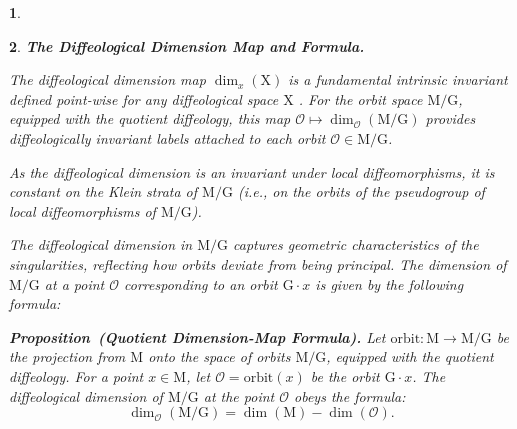 \documentclass[10pt,reqno,letterpaper,twoside]{amsart}
\theoremstyle{article}
\newtheorem{article}{}
\def\artlabel[#1]{\textbf{#1.}}
\newenvironment{proposition}[1]%
{\noindent\textbf{Proposition#1.} \it}%
{}
\newcommand{\cO}{{\mathcal O}}
\def \G{\mathrm G}
\def \M{\mathrm M}
\def \X{\mathrm X}
\newcommand{\orbit}{{\mathrm{orbit}}}
\begin{document}
\begin{article}
  \end{article}
  
  
  \begin{article}
    \artlabel[The Diffeological Dimension Map and Formula]
    \label{The_Dimension_Map_on_the_Quotient_Space}
    
    The diffeological dimension map $\dim_x(\X)$ is a fundamental intrinsic invariant defined point-wise for any diffeological space $\X$ \cite{PIZ07, PIZ13}.
    For the orbit space $\M/\G$,
    equipped with the quotient diffeology,
    this map $\cO \mapsto \dim_{\cO}(\M/\G)$ provides diffeologically invariant labels attached to each orbit $\cO \in \M/\G$.
    
    As the diffeological dimension is an invariant under local diffeomorphisms, it is constant on the Klein strata of $\M/\G$
    (i.e., on the orbits of the pseudogroup of local diffeomorphisms of $\M/\G$).
    
    The diffeological dimension in $\M/\G$ captures geometric characteristics of the singularities,
    reflecting how orbits deviate from being principal.
    The dimension of $\M/\G$ at a point $\cO$ corresponding to an orbit $\G \cdot x$ is given by the following formula:
    
    \begin{proposition}{~(Quotient Dimension-Map Formula)}
      \label{prop:dim_formula_orbit_space}
      Let $\orbit: \M \to \M/\G$ be the projection from $\M$ onto the space of orbits $\M/\G$,
      equipped with the quotient diffeology.
      For a point $x \in \M$, let $\cO = \orbit(x)$ be the orbit $\G \cdot x$.
      The diffeological dimension of $\M/\G$ at the point $\cO$ obeys the formula:
      \begin{equation}\tag{$\clubsuit$}
        \dim_{\cO}(\M/\G) = \dim(\M) - \dim(\cO).
      \end{equation}
    \end{proposition}
    
  \end{article}
  
\end{document}
